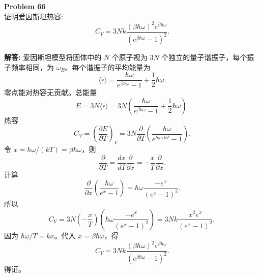 \documentclass[12pt, a4paper, oneside]{ctexart}
\newenvironment{solution}{\par\noindent\textbf{解答:}\quad}{\par}
\begin{document}
\begin{mdframed}[backgroundcolor=gray!10, linewidth=0pt]
    \textbf{Problem 66} \\
    证明爱因斯坦热容:
    \[
    C_V = 3 N k \frac{(\beta \hbar \omega)^2 e^{\beta \hbar \omega}}{(e^{\beta \hbar \omega} - 1)^2}.
    \]
\end{mdframed}
\begin{solution}
    爱因斯坦模型将固体中的 $N$ 个原子视为 $3N$ 个独立的量子谐振子，每个振子频率相同，为 $\omega_E$。每个谐振子的平均能量为
    \[
    \langle \epsilon \rangle = \frac{\hbar \omega}{e^{\beta \hbar \omega} - 1} + \frac{1}{2} \hbar \omega.
    \]
    零点能对热容无贡献。总能量
    \[
    E = 3N \langle \epsilon \rangle = 3N \left( \frac{\hbar \omega}{e^{\beta \hbar \omega} - 1} + \frac{1}{2} \hbar \omega \right).
    \]
    热容
    \[
    C_V = \left( \frac{\partial E}{\partial T} \right)_V = 3N \frac{\partial}{\partial T} \left( \frac{\hbar \omega}{e^{\hbar \omega / kT} - 1} \right).
    \]
    令 $x = \hbar \omega / (kT) = \beta \hbar \omega$，则
    \[
    \frac{\partial}{\partial T} = \frac{dx}{dT} \frac{\partial}{\partial x} = -\frac{x}{T} \frac{\partial}{\partial x}.
    \]
    计算
    \[
    \frac{\partial}{\partial x} \left( \frac{\hbar \omega}{e^x - 1} \right) = \hbar \omega \frac{-e^x}{(e^x - 1)^2}.
    \]
    所以
    \[
    C_V = 3N \left( -\frac{x}{T} \right) \left( \hbar \omega \frac{-e^x}{(e^x - 1)^2} \right) = 3N k \frac{x^2 e^x}{(e^x - 1)^2},
    \]
    因为 $\hbar \omega / T = k x$。代入 $x = \beta \hbar \omega$，得
    \[
    C_V = 3 N k \frac{(\beta \hbar \omega)^2 e^{\beta \hbar \omega}}{(e^{\beta \hbar \omega} - 1)^2}.
    \]
    得证。
\end{solution}
\end{document}
